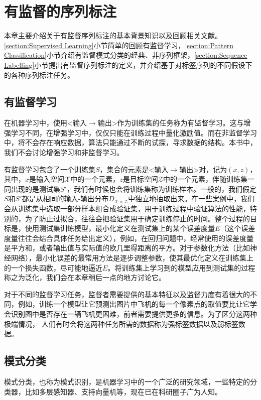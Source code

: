 \chapter{有监督的序列标注}
本章主要介绍关于有监督序列标注的基本背景知识以及回顾相关文献。\ref{section:Supervised Learning}小节简单的回顾有监督学习，\ref{section:Pattern Classification}小节介绍有监督模式分类的经典、非序列框架，\ref{section:Sequence Labelling}小节提出有监督序列标注的定义，并介绍基于对标签序列的不同假设下的各种序列标注任务。
\section{有监督学习\label{section:Supervised Learning}}
在机器学习中，使用<输入$\rightarrow$输出>作为训练集的任务称为有监督学习。这与增强学习不同，在增强学习中，仅仅只能在训练过程中量化激励值。而在非监督学习中，将不会存在响应数据，算法只能通过不断的试探，寻求数据的结构。本书中，我们不会讨论增强学习和非监督学习。

有监督学习包含了一个训练集$S$，集合的元素是<输入$\rightarrow$输出>对，记为$(x, z)$，其中，$x$是输入空间$\mathcal{X}$中的一个元素，$z$是目标空间$\mathcal{Z}$中的一个元素，伴随训练集一同出现的是测试集$S'$，我们有时候也会将训练集称为训练样本。一般的，我们假定$S$和$S'$都是从相同的输入-输出分布$D_{\mathcal{X}\times \mathcal{Z}}$中独立地抽取出来。在一些案例中，我们会从训练集中选取一部分样本组合成验证集，用于训练过程中验证算法的性能，特别的，为了防止过拟合，往往会把验证集用于确定训练停止的时间。整个过程的目标是，使用测试集训练模型，最小化定义在测试集上的某个误差度量$E$（这个误差度量往往会结合具体任务给出定义），例如，在回归问题中，经常使用的误差度量是平方和，或者输出值与实际值的欧几里得距离的平方。对于参数化方法（比如神经网络），最小化误差的最常用方法是逐步调整参数，使其最优化定义在训练集上的一个损失函数，尽可能地逼近$E$。将训练集上学习到的模型应用到测试集的过程称之为泛化，我们会在本章稍后一点的地方讨论它。

对于不同的监督学习任务，监督者需要提供的基本特征以及监督力度有着很大的不同，例如，训练一个模型让它预测出图片中飞机的每一个像素点的取值要比让它学会识别图中是否存在一辆飞机更困难，前者需要提供更多的信息。为了区分这两种极端情况，	人们有时会将这两种任务所需的数据称为强标签数据以及弱标签数据。
\section{模式分类\label{section:Pattern Classification}}
模式分类，也称为模式识别，是机器学习中的一个广泛的研究领域，一些特定的分类器，比如多层感知器、支持向量机等，现在已在科研圈子广为人知。

